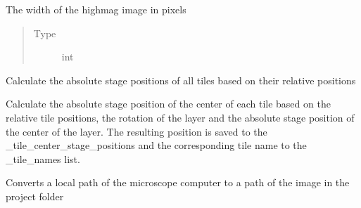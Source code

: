 \documentclass[letterpaper,10pt,english]{sphinxmanual}
\begin{document}
\begin{fulllineitems}
\begin{fulllineitems}
\begin{quote}
\begin{description}
\end{description}\end{quote}

\end{fulllineitems}


\begin{fulllineitems}
\label{\detokenize{index:sites_of_interest_parser.MapsXmlParser.img_width}}
The width of the highmag image in pixels
\begin{quote}\begin{description}
\item[{Type}] \leavevmode
int

\end{description}\end{quote}

\end{fulllineitems}


\begin{fulllineitems}
\label{\detokenize{index:sites_of_interest_parser.MapsXmlParser.calculate_absolute_tile_coordinates}}
Calculate the absolute stage positions of all tiles based on their relative positions

Calculate the absolute stage position of the center of each tile based on the relative tile positions, the
rotation of the layer and the absolute stage position of the center of the layer. The resulting position is
saved to the \_tile\_center\_stage\_positions and the corresponding tile name to the \_tile\_names list.

\end{fulllineitems}


\begin{fulllineitems}
\label{\detokenize{index:sites_of_interest_parser.MapsXmlParser.convert_img_path_to_local_path}}
Converts a local path of the microscope computer to a path of the image in the project folder


\end{fulllineitems}
\end{fulllineitems}
\end{document}
